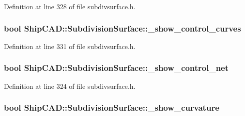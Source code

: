Definition at line 328 of file subdivsurface.\-h.

\hypertarget{classShipCAD_1_1SubdivisionSurface_ae240b2177e0af0bd1512c94b524f22dd}{
\subsubsection[{\-\_\-show\-\_\-control\-\_\-curves}]{\setlength{\rightskip}{0pt plus 5cm}bool Ship\-C\-A\-D\-::\-Subdivision\-Surface\-::\-\_\-show\-\_\-control\-\_\-curves\hspace{0.3cm}{\ttfamily [protected]}}}\label{classShipCAD_1_1SubdivisionSurface_ae240b2177e0af0bd1512c94b524f22dd}


Definition at line 331 of file subdivsurface.\-h.

\hypertarget{classShipCAD_1_1SubdivisionSurface_ab9bb374cf1368b4a2c779f953bca88a8}{
\subsubsection[{\-\_\-show\-\_\-control\-\_\-net}]{\setlength{\rightskip}{0pt plus 5cm}bool Ship\-C\-A\-D\-::\-Subdivision\-Surface\-::\-\_\-show\-\_\-control\-\_\-net\hspace{0.3cm}{\ttfamily [protected]}}}\label{classShipCAD_1_1SubdivisionSurface_ab9bb374cf1368b4a2c779f953bca88a8}


Definition at line 324 of file subdivsurface.\-h.

\hypertarget{classShipCAD_1_1SubdivisionSurface_abe2167085eac50c986b074635b610462}{
\subsubsection[{\-\_\-show\-\_\-curvature}]{\setlength{\rightskip}{0pt plus 5cm}bool Ship\-C\-A\-D\-::\-Subdivision\-Surface\-::\-\_\-show\-\_\-curvature\hspace{0.3cm}{\ttfamily [protected]}}}\label{classShipCAD_1_1SubdivisionSurface_abe2167085eac50c986b074635b610462}


